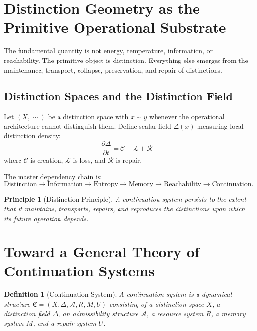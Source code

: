 \documentclass[12pt,a4paper]{article}
\newtheorem{definition}[theorem]{Definition}
\newtheorem*{principle}{Principle}
\newcommand{\A}{\mathcal{A}}
\begin{document}
\section{Distinction Geometry as the Primitive Operational Substrate}

The fundamental quantity is not energy, temperature, information, or reachability. The primitive object is distinction. Everything else emerges from the maintenance, transport, collapse, preservation, and repair of distinctions.

\subsection{Distinction Spaces and the Distinction Field}

Let $(X, \sim)$ be a distinction space with $x \sim y$ whenever the operational architecture cannot distinguish them. Define scalar field $\Delta(x)$ measuring local distinction density:
\[
\frac{\partial \Delta}{\partial t} = \mathcal{C} - \mathcal{L} + \mathcal{R}
\]
where $\mathcal{C}$ is creation, $\mathcal{L}$ is loss, and $\mathcal{R}$ is repair.

The master dependency chain is:
\[
\text{Distinction} \to \text{Information} \to \text{Entropy} \to \text{Memory} \to \text{Reachability} \to \text{Continuation}.
\]

\begin{principle}[Distinction Principle]
A continuation system persists to the extent that it maintains, transports, repairs, and reproduces the distinctions upon which its future operation depends.
\end{principle}

\section{Toward a General Theory of Continuation Systems}

\begin{definition}[Continuation System]
A \emph{continuation system} is a dynamical structure $\mathfrak{C} = (X, \Delta, \A, R, M, U)$ consisting of a distinction space $X$, a distinction field $\Delta$, an admissibility structure $\A$, a resource system $R$, a memory system $M$, and a repair system $U$.
\end{definition}
\end{document}
